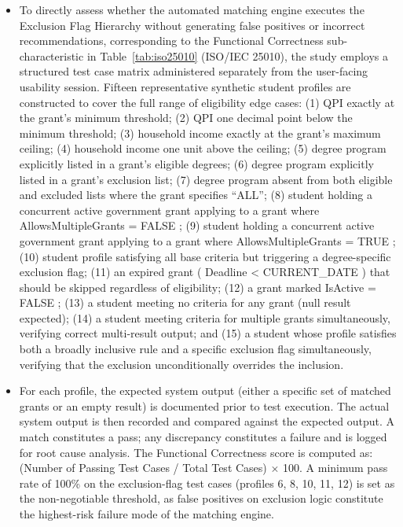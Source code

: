 \begin{itemize}
\begin{itemize}
    \item To directly assess whether the automated matching engine executes the Exclusion Flag Hierarchy without generating false positives or incorrect recommendations, corresponding to the Functional Correctness sub-characteristic in Table~\ref{tab:iso25010} (ISO/IEC 25010), the study employs a structured test case matrix administered separately from the user-facing usability session. Fifteen representative synthetic student profiles are constructed to cover the full range of eligibility edge cases: (1) QPI exactly at the grant's minimum threshold; (2) QPI one decimal point below the minimum threshold; (3) household income exactly at the grant's maximum ceiling; (4) household income one unit above the ceiling; (5) degree program explicitly listed in a grant's eligible degrees; (6) degree program explicitly listed in a grant's exclusion list; (7) degree program absent from both eligible and excluded lists where the grant specifies ``ALL''; (8) student holding a concurrent active government grant applying to a grant where AllowsMultipleGrants = FALSE ; (9) student holding a concurrent active government grant applying to a grant where AllowsMultipleGrants = TRUE ; (10) student profile satisfying all base criteria but triggering a degree-specific exclusion flag; (11) an expired grant ( Deadline \textless{} CURRENT\_DATE ) that should be skipped regardless of eligibility; (12) a grant marked IsActive = FALSE ; (13) a student meeting no criteria for any grant (null result expected); (14) a student meeting criteria for multiple grants simultaneously, verifying correct multi-result output; and (15) a student whose profile satisfies both a broadly inclusive rule and a specific exclusion flag simultaneously, verifying that the exclusion unconditionally overrides the inclusion.
    \item For each profile, the expected system output (either a specific set of matched grants or an empty result) is documented prior to test execution. The actual system output is then recorded and compared against the expected output. A match constitutes a pass; any discrepancy constitutes a failure and is logged for root cause analysis. The Functional Correctness score is computed as: (Number of Passing Test Cases / Total Test Cases) $\times$ 100. A minimum pass rate of 100\% on the exclusion-flag test cases (profiles 6, 8, 10, 11, 12) is set as the non-negotiable threshold, as false positives on exclusion logic constitute the highest-risk failure mode of the matching engine.
  \end{itemize}

\end{itemize}
